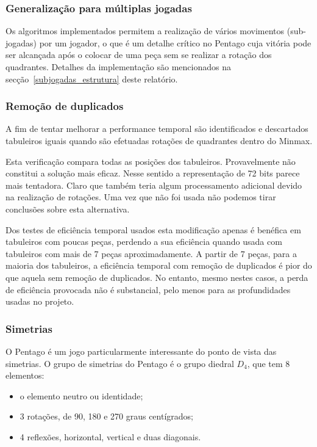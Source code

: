 \subsubsection{Generalização para múltiplas jogadas}

Os algoritmos implementados permitem a realização de vários movimentos (sub-jogadas) por um jogador, o que é um detalhe crítico no Pentago cuja vitória pode ser alcançada após o colocar de uma peça sem se realizar a rotação dos quadrantes. Detalhes da implementação são mencionados na secção~\ref{subjogadas_estrutura} deste relatório.

\subsubsection{Remoção de duplicados}

A fim de tentar melhorar a performance temporal são identificados e descartados tabuleiros iguais quando são efetuadas rotações de quadrantes dentro do Minmax. 

Esta verificação compara todas as posições dos tabuleiros. Provavelmente não constitui a solução mais eficaz. Nesse sentido a representação de 72 bits parece mais tentadora. Claro que  também teria algum processamento adicional devido na realização de rotações. Uma vez que não foi usada não podemos tirar conclusões sobre esta alternativa. 

Dos testes de eficiência temporal usados esta modificação apenas é benéfica em tabuleiros com poucas peças, perdendo a sua eficiência quando usada com tabuleiros com mais de 7 peças aproximadamente. A partir de 7 peças, para a maioria dos tabuleiros, a eficiência temporal com remoção de duplicados é pior do que aquela sem remoção de duplicados. No entanto, mesmo nestes casos, a perda de eficiência provocada não é substancial, pelo menos para as profundidades usadas no projeto.

\subsubsection{Simetrias}

O Pentago é um jogo particularmente interessante do ponto de vista das simetrias. O grupo de simetrias do Pentago é o grupo diedral $D_4$, que tem 8 elementos:
\begin{itemize}
	\item o elemento neutro ou identidade;
	\item 3 rotações, de 90, 180 e 270 graus centígrados;
	\item 4 reflexões, horizontal, vertical e duas diagonais.
\end{itemize}


